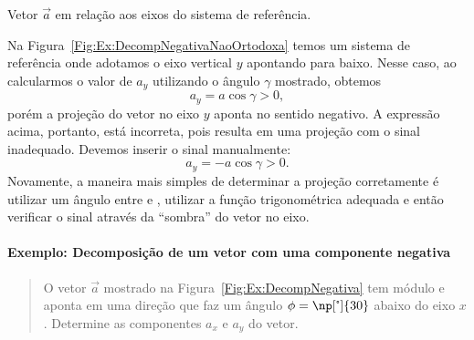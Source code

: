 \begin{marginfigure}[2cm]
\centering
{}
\caption{Vetor $\vec{a}$ em relação aos eixos do sistema de referência. \label{Fig:Ex:DecompNegativaNaoOrtodoxa}}
\end{marginfigure}

Na Figura~\ref{Fig:Ex:DecompNegativaNaoOrtodoxa} temos um sistema de referência onde adotamos o eixo vertical $y$ apontando para baixo. Nesse caso, ao calcularmos o valor de $a_y$ utilizando o ângulo $\gamma$ mostrado, obtemos
\begin{equation}
    a_y = a \cos\gamma > 0,
\end{equation}
%
porém a projeção do vetor no eixo $y$ aponta no sentido negativo. A expressão acima, portanto, está incorreta, pois resulta em uma projeção com o sinal inadequado. Devemos inserir o sinal manualmente:
\begin{equation}
    a_y = -a \cos\gamma > 0.
\end{equation}
%
Novamente, a maneira mais simples de determinar a projeção corretamente é utilizar um ângulo entre  e , utilizar a função trigonométrica adequada e então verificar o sinal através da ``sombra'' do vetor no eixo.


\paragraph{Exemplo: Decomposição de um vetor com uma componente negativa}

\begin{quote}
    O vetor $\vec{a}$ mostrado na Figura~\ref{Fig:Ex:DecompNegativa} tem módulo  e aponta em uma direção que faz um ângulo $\phi = \np[\tcdegree]{30}$ abaixo do eixo $x$. Determine as componentes $a_x$ e $a_y$ do vetor.
\end{quote}

